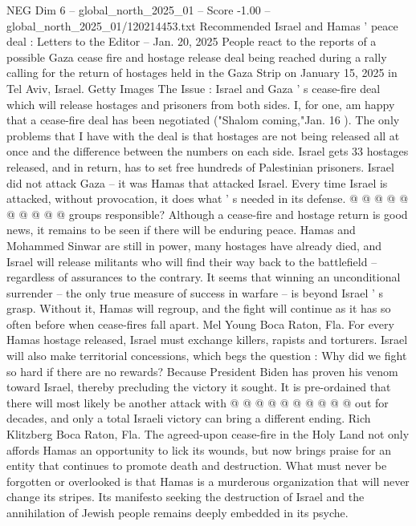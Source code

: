 \begin{textsample}{NEG Dim 6 – global\_north\_2025\_01 – Score -1.00 – global\_north\_2025\_01/120214453.txt}  \label{ex:f6_neg_186}
Recommended Israel and Hamas ' peace deal : Letters to the Editor -- Jan. 20, 2025 People react to the reports of a possible Gaza cease fire and hostage release deal being reached during a rally calling for the return of hostages held in the Gaza Strip on January 15, 2025 in Tel Aviv, Israel.
Getty Images The Issue : Israel and Gaza ' s cease-fire deal which will release hostages and prisoners from both sides.
I, for one, am happy that a cease-fire deal has been negotiated ("Shalom coming,"Jan. 16 ).
The only problems that I have with the deal is that hostages are not being released all at once and the difference between the numbers on each side.
Israel gets 33 hostages released, and in return, has to set free hundreds of Palestinian prisoners.
Israel did not attack Gaza -- it was Hamas that attacked Israel.
Every time Israel is attacked, without provocation, it does what ' s needed in its defense. @ @ @ @ @ @ @ @ @ @ groups responsible?
Although a cease-fire and hostage return is good news, it remains to be seen if there will be enduring peace.
Hamas and Mohammed Sinwar are still in power, many hostages have already died, and Israel will release militants who will find their way back to the battlefield -- regardless of assurances to the contrary.
It seems that winning an unconditional surrender -- the only true measure of success in warfare -- is beyond Israel ' s grasp.
Without it, Hamas will regroup, and the fight will continue as it has so often before when cease-fires fall apart.
Mel Young Boca Raton, Fla.
For every Hamas hostage released, Israel must exchange killers, rapists and torturers.
Israel will also make territorial concessions, which begs the question : Why did we fight so hard if there are no rewards?
Because President Biden has proven his venom toward Israel, thereby precluding the victory it sought.
It is pre-ordained that there will most likely be another attack with @ @ @ @ @ @ @ @ @ @ out for decades, and only a total Israeli victory can bring a different ending.
Rich Klitzberg Boca Raton, Fla.
The agreed-upon cease-fire in the Holy Land not only affords Hamas an opportunity to lick its wounds, but now brings praise for an entity that continues to promote death and destruction.
What must never be forgotten or overlooked is that Hamas is a murderous organization that will never change its stripes.
Its manifesto seeking the destruction of Israel and the annihilation of Jewish people remains deeply embedded in its psyche.

\end{textsample}
